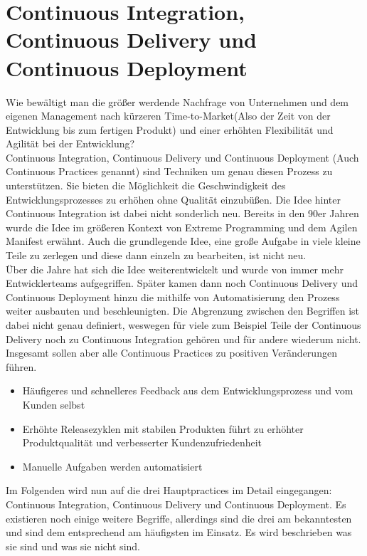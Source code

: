 \section{Continuous Integration, Continuous Delivery und Continuous Deployment}
Wie bewältigt man die größer werdende Nachfrage von Unternehmen und dem eigenen Management nach kürzeren Time-to-Market(Also der Zeit von der Entwicklung bis zum fertigen Produkt) und einer erhöhten Flexibilität und Agilität bei der Entwicklung?\autocite{Capgemini.2017}\\ Continuous Integration, Continuous Delivery und Continuous Deployment (Auch Continuous Practices genannt) sind Techniken um genau diesen Prozess zu unterstützen.  Sie bieten die Möglichkeit die Geschwindigkeit des Entwicklungsprozesses zu erhöhen ohne Qualität einzubüßen.\autocite[Vgl.][S.2]{Shahin.2017}
Die Idee hinter Continuous Integration ist dabei nicht sonderlich neu. Bereits in den 90er Jahren wurde die Idee im größeren Kontext von Extreme Programming und dem Agilen Manifest erwähnt.\autocite[Vgl.][S.2]{Stahl.2018} Auch die grundlegende Idee, eine große Aufgabe in viele kleine Teile zu zerlegen und diese dann einzeln zu bearbeiten, ist nicht neu.\\ Über die Jahre hat sich die Idee weiterentwickelt und wurde von immer mehr Entwicklerteams aufgegriffen. Später kamen dann noch Continuous Delivery und Continuous Deployment hinzu die mithilfe von Automatisierung den Prozess weiter ausbauten und beschleunigten. Die Abgrenzung zwischen den Begriffen ist dabei nicht genau definiert, weswegen für viele zum Beispiel Teile der Continuous Delivery noch zu Continuous Integration gehören und für andere wiederum nicht. Insgesamt sollen aber alle Continuous Practices zu positiven Veränderungen führen.\autocite[Vgl.][S.2]{Shahin.2017}
\begin{itemize}
	\item Häufigeres und schnelleres Feedback aus dem Entwicklungsprozess und vom Kunden selbst 
	\item Erhöhte Releasezyklen mit stabilen Produkten führt zu erhöhter Produktqualität und verbesserter Kundenzufriedenheit
	\item Manuelle Aufgaben werden automatisiert
\end{itemize}
Im Folgenden wird nun auf die drei Hauptpractices im Detail eingegangen: Continuous Integration, Continuous Delivery und Continuous Deployment. Es existieren noch einige weitere Begriffe, allerdings sind die drei am bekanntesten und sind dem entsprechend am häufigsten im Einsatz. Es wird beschrieben was sie sind und was sie nicht sind. 
